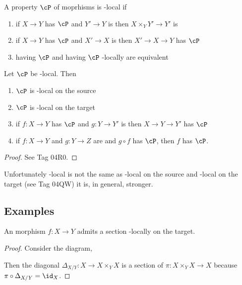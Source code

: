 \documentclass[12pt]{article}
\begin{document}
\begin{defn}
A property $\cP$ of moprhisms is \etale-local if 
\begin{enumerate}
\item if $X \to Y$ has $\cP$ and $Y' \to Y$ is \etale then $X \times_Y Y' \to Y'$ is \etale
\item if $X \to Y$ has $\cP$ and $X' \to X$ is \etale then $X' \to X \to Y$ has $\cP$
\item having $\cP$ and having $\cP$ \etale-locally are equivalent
\end{enumerate}
\end{defn}

\begin{lemma}
Let $\cP$ be \etale-local. Then
\begin{enumerate}
\item $\cP$ is \etale-local on the source
\item $\cP$ is \etale-local on the target
\item if $f : X \to Y$ has $\cP$ and $g : Y \to Y'$ is \etale then $X \to Y \to Y'$ has $\cP$ 
\item if $f : X \to Y$ and $g : Y \to Z$ are \etale and $g \circ f$ has $\cP$, then $f$ has $\cP$.
\end{enumerate}
\end{lemma}

\begin{proof}
See Tag 04R0.
\end{proof}

\begin{rmk}
Unfortunately \etale-local is not the same as \etale-local on the source and \etale-local on the target (see Tag 04QW) it is, in general, stronger.
\end{rmk}

\subsection{Examples}

\begin{prop}
An \etale morphism $f : X \to Y$ admits a section \etale-locally on the target.
\end{prop}

\begin{proof}
Consider the diagram,
\begin{center}
\end{center}
Then the diagonal $\Delta_{X/Y} : X \to X \times_Y X$ is a section of $\pi : X \times_Y X \to X$ because $\pi \circ \Delta_{X/Y} = \id_X$.
\end{proof}
\end{document}
